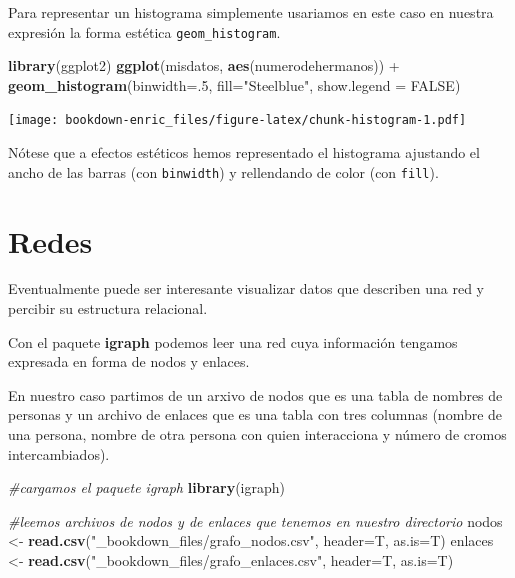 \documentclass[]{book}
\newenvironment{Shaded}{\begin{snugshade}}{\end{snugshade}}
\newcommand{\KeywordTok}[1]{\textcolor[rgb]{0.13,0.29,0.53}{\textbf{{#1}}}}
\newcommand{\DataTypeTok}[1]{\textcolor[rgb]{0.13,0.29,0.53}{{#1}}}
\newcommand{\DecValTok}[1]{\textcolor[rgb]{0.00,0.00,0.81}{{#1}}}
\newcommand{\StringTok}[1]{\textcolor[rgb]{0.31,0.60,0.02}{{#1}}}
\newcommand{\CommentTok}[1]{\textcolor[rgb]{0.56,0.35,0.01}{\textit{{#1}}}}
\newcommand{\OtherTok}[1]{\textcolor[rgb]{0.56,0.35,0.01}{{#1}}}
\newcommand{\NormalTok}[1]{{#1}}
\theoremstyle{definition}
\theoremstyle{definition}
\theoremstyle{remark}
\begin{document}
Para representar un histograma simplemente usariamos en este caso en
nuestra expresión la forma estética \texttt{geom\_histogram}.

\begin{Shaded}
\begin{Highlighting}[]
\KeywordTok{library}\NormalTok{(ggplot2)}
\KeywordTok{ggplot}\NormalTok{(misdatos, }\KeywordTok{aes}\NormalTok{(numerodehermanos)) +}
\StringTok{  }\KeywordTok{geom_histogram}\NormalTok{(}\DataTypeTok{binwidth=}\NormalTok{.}\DecValTok{5}\NormalTok{, }\DataTypeTok{fill=}\StringTok{"Steelblue"}\NormalTok{, }\DataTypeTok{show.legend =} \OtherTok{FALSE}\NormalTok{)}
\end{Highlighting}
\end{Shaded}

\texttt{[image: bookdown-enric\_files/figure-latex/chunk-histogram-1.pdf]}

Nótese que a efectos estéticos hemos representado el histograma
ajustando el ancho de las barras (con \texttt{binwidth}) y rellendando
de color (con \texttt{fill}).

\section{Redes}\label{redes}

Eventualmente puede ser interesante visualizar datos que describen una
red y percibir su estructura relacional.

Con el paquete \textbf{igraph} \citep{R-igraph} podemos leer una red
cuya información tengamos expresada en forma de nodos y enlaces.

En nuestro caso partimos de un arxivo de nodos que es una tabla de
nombres de personas y un archivo de enlaces que es una tabla con tres
columnas (nombre de una persona, nombre de otra persona con quien
interacciona y número de cromos intercambiados).

\begin{Shaded}
\begin{Highlighting}[]
\CommentTok{#cargamos el paquete igraph}
\KeywordTok{library}\NormalTok{(igraph)}

\CommentTok{#leemos archivos de nodos y de enlaces que tenemos en nuestro directorio}
\NormalTok{nodos <-}\StringTok{ }\KeywordTok{read.csv}\NormalTok{(}\StringTok{"_bookdown_files/grafo_nodos.csv"}\NormalTok{, }\DataTypeTok{header=}\NormalTok{T, }\DataTypeTok{as.is=}\NormalTok{T)}
\NormalTok{enlaces <-}\StringTok{ }\KeywordTok{read.csv}\NormalTok{(}\StringTok{"_bookdown_files/grafo_enlaces.csv"}\NormalTok{, }\DataTypeTok{header=}\NormalTok{T, }\DataTypeTok{as.is=}\NormalTok{T)}
\end{Highlighting}
\end{Shaded}
\end{document}
